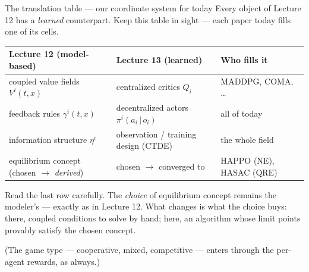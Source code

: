 \documentclass[10pt, aspectratio=169]{beamer}
\begin{document}
\begin{frame}{The translation table --- our coordinate system for today}
Every object of Lecture 12 has a \emph{learned} counterpart. Keep this table in sight --- each paper today fills one of its cells.
\medskip
\begin{center}\scriptsize\renewcommand{\arraystretch}{1.55}
\begin{tabular}{l|l|l}
\textbf{Lecture 12 (model-based)} & \textbf{Lecture 13 (learned)} & \textbf{Who fills it} \\
\hline
coupled value fields $V^i(t,x)$ & centralized critics $Q_i$ & MADDPG, COMA, \dots \\
feedback rules $\gamma^i(t,x)$ & decentralized actors $\pi^i(a_i\,|\,o_i)$ & all of today \\
information structure $\eta^i$ & observation / training design (CTDE) & the whole field \\
equilibrium concept (chosen $\to$ \emph{derived}) & chosen $\to$ \alert{converged to} & HAPPO (NE), HASAC (QRE) \\
\end{tabular}
\end{center}
\medskip

\pause
Read the last row carefully. The \emph{choice} of equilibrium concept remains the modeler's --- exactly as in Lecture 12. What changes is \alert{what the choice buys}: there, coupled conditions to solve by hand; here, an algorithm whose limit points \alert{provably satisfy the chosen concept}.
\smallskip

{\footnotesize\textcolor{mLightBrown}{(The game type --- cooperative, mixed, competitive --- enters through the per-agent rewards, as always.)}}
\end{frame}
\end{document}
